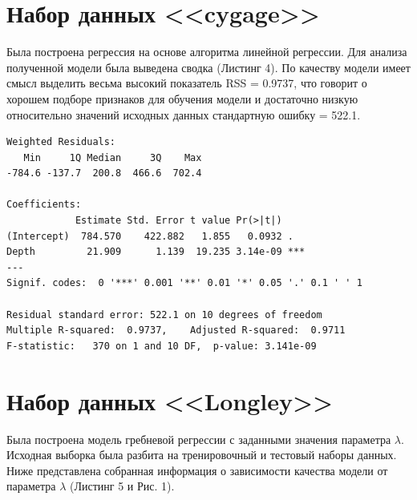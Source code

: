 \documentclass[]{article}
\numberwithin{equation}{section}
\begin{document}
    \section{Набор данных <<cygage>>}

    Была построена регрессия на основе алгоритма линейной регрессии. Для анализа полученной модели была выведена сводка (Листинг 4). По качеству модели имеет смысл выделить весьма высокий показатель RSS = 0.9737, что говорит о хорошем подборе признаков для обучения модели и достаточно низкую относительно значений исходных данных стандартную ошибку = 522.1.

    \newpage
    \begin{lstlisting}[style = TEXTstyle, caption = Сводка по модели линейной регрессии]
Weighted Residuals:
   Min     1Q Median     3Q    Max
-784.6 -137.7  200.8  466.6  702.4

Coefficients:
            Estimate Std. Error t value Pr(>|t|)
(Intercept)  784.570    422.882   1.855   0.0932 .
Depth         21.909      1.139  19.235 3.14e-09 ***
---
Signif. codes:  0 '***' 0.001 '**' 0.01 '*' 0.05 '.' 0.1 ' ' 1

Residual standard error: 522.1 on 10 degrees of freedom
Multiple R-squared:  0.9737,    Adjusted R-squared:  0.9711
F-statistic:   370 on 1 and 10 DF,  p-value: 3.141e-09
    \end{lstlisting}

    \section{Набор данных <<Longley>>}

    Была построена модель гребневой регрессии с заданными значения параметра $\lambda$. Исходная выборка была разбита на тренировочный и тестовый наборы данных. Ниже представлена собранная информация о зависимости качества модели от параметра $\lambda$ (Листинг 5 и Рис. 1).
\end{document}
